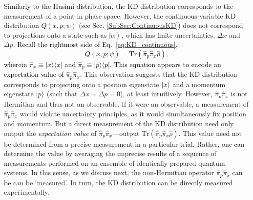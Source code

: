 \documentclass[%
 reprint,
superscriptaddress,
nofootinbib,
bibnotes,
 amsmath,amssymb,
 aps,
]{revtex4-1}
\theoremstyle{plain}
\newcommand*{\ketbra}[2]{\lvert #1 \rangle\!\langle #2 \rvert}
\newcommand{\Dave}[1]{\textcolor{black}{#1} }
\newcommand{\nicole}[1]{\textcolor{black}{#1} }
\begin{document}
Similarly to the Husimi distribution, the KD distribution corresponds to the measurement of a point in phase space. However, the continuous-variable KD distribution  \Dave{$ Q(x,p;\psi)$ (see Sec. \ref{SubSec:ContinuousKD})} does not correspond to projections onto a state such as $\left|\alpha\right\rangle $,
which has finite uncertainties, $\Delta x$ and $\Delta p$. 
\nicole{Recall the rightmost side of Eq.~\eqref{eq:KD_continuous}, 
\begin{equation}
 Q(x,p;\psi)=\mathrm{Tr}\left(\hat{\pi}_{p}\hat{\pi}_{x}\hat{\rho}\right) ,
\end{equation}
wherein $\hat{\pi}_{x} \equiv \ketbra{x}{x}$ and $\hat{\pi}_{p} \equiv \ketbra{p}{p}$.
This equation appears to encode an expectation value of 
$\hat{\pi}_{p}\hat{\pi}_{x}.$  }
This observation suggests that the KD distribution corresponds to projecting onto 
 a position eigenstate $\ket{x}$ and a momentum eigenstate $\ket{p}$  (such that $\Delta x=\Delta p=0$),  
at least intuitively. However, $\hat{\pi}_{p}\hat{\pi}_{x}$ is not Hermitian and thus not an observable. If it were an observable, a measurement of $\hat{\pi}_{p}\hat{\pi}_{x}$  would violate
uncertainty principles, as it would simultaneously fix  position and momentum. But a direct measurement of the KD distribution need only output the \textit{expectation value} of $\hat{\pi}_{p}\hat{\pi}_{x}$---output 
$\mathrm{Tr}\left(\hat{\pi}_{p}\hat{\pi}_{x}\hat{\rho}\right)$. 
This value need not be determined from a precise measurement in a particular trial.
Rather, one can determine the value
by averaging the imprecise results of a sequence of measurements performed on an ensemble of identically prepared quantum systems. In this sense, as we discuss next, the non-Hermitian operator $\hat{\pi}_{p}\hat{\pi}_{x}$ can be can be `measured'. In turn, the KD distribution can be directly measured experimentally. 
\end{document}
